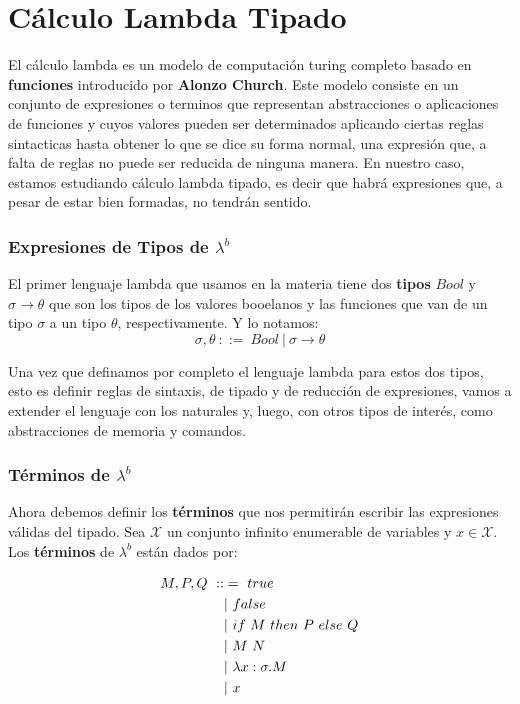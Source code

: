 \section{Cálculo Lambda Tipado}

El cálculo lambda es un modelo de computación turing completo basado en \textbf{funciones} introducido por \textbf{Alonzo Church}. Este modelo consiste en un conjunto de expresiones o terminos que representan abstracciones o aplicaciones de funciones y cuyos valores pueden ser determinados aplicando ciertas reglas sintacticas hasta obtener lo 	que se dice su forma normal, una expresión que, a falta de reglas no puede ser reducida de ninguna manera. En nuestro caso, estamos estudiando cálculo lambda tipado, es decir que habrá expresiones que, a pesar de estar bien formadas, no tendrán sentido.

\subsubsection{Expresiones de Tipos de \texorpdfstring{$\lambda^b$}{lambda b}}
El primer lenguaje lambda que usamos en la materia tiene dos \textbf{tipos} $Bool$ y $\sigma\rightarrow\theta$ que son los tipos de los valores booelanos y las funciones que van de un tipo $\sigma$ a un tipo $\theta$, respectivamente. Y lo notamos:
\begin{equation*}
	\sigma,\theta ~::=~ Bool ~|~ \sigma\rightarrow\theta
\end{equation*}

Una vez que definamos por completo el lenguaje lambda para estos dos tipos, esto es definir reglas de sintaxis, de tipado y de reducción de expresiones, vamos a extender el lenguaje con los naturales y, luego, con otros tipos de interés, como abstracciones de memoria y comandos.
\subsubsection{Términos de \texorpdfstring{$\lambda^b$}{lambda b}}
Ahora debemos definir los \textbf{términos} que nos permitirán escribir las expresiones válidas del tipado. Sea $\mathcal{X}$ un conjunto infinito enumerable de variables y $x\in\mathcal{X}$. Los \textbf{términos} de $\lambda^b$ están dados por:

\begin{equation*}
\begin{split}
    M, P, Q ~ ::&= ~ true \\
    & |~ false \\
    & |~ if~ M~ then~ P~ else~ Q \\
    & |~ M~N \\
    & |~ \lambda x: \sigma . M \\
    & |~ x
\end{split}
\end{equation*}

